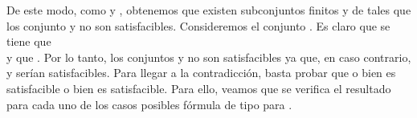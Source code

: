 \begin{isabellebody}
\begin{isamarkuptext}
\begin{demostracion}
    De este modo, como  y , obtenemos que existen subconjuntos finitos 
     y  de  tales que los conjunto  y  no son satisfacibles. 
    Consideremos el conjunto . Es claro que se tiene que\\  y 
    que . Por lo tanto, los conjuntos  y  no son 
    satisfacibles ya que, en caso contrario,  y  serían satisfacibles. Para 
    llegar a la contradicción, basta probar que o bien  es satisfacible o bien 
     es satisfacible. Para ello, veamos que se verifica el resultado para cada uno de 
    los casos posibles fórmula de tipo \isa{{\isasymbeta}} para .


\end{demostracion}
\end{isamarkuptext}
\end{isabellebody}
